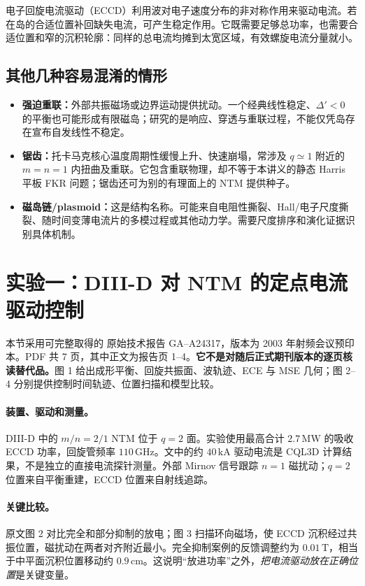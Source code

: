 电子回旋电流驱动（ECCD）利用波对电子速度分布的非对称作用来驱动电流。若在岛的合适位置补回缺失电流，可产生稳定作用。它既需要足够总功率，也需要合适位置和窄的沉积轮廓：同样的总电流均摊到太宽区域，有效螺旋电流分量就小。

\subsection{其他几种容易混淆的情形}

\begin{itemize}
 \item \textbf{强迫重联：}外部共振磁场或边界运动提供扰动。一个经典线性稳定、$\Delta'<0$ 的平衡也可能形成有限磁岛；研究的是响应、穿透与重联过程，不能仅凭岛存在宣布自发线性不稳定。
 \item \textbf{锯齿：}托卡马克核心温度周期性缓慢上升、快速崩塌，常涉及 $q\simeq1$ 附近的 $m=n=1$ 内扭曲及重联。它包含重联物理，却不等于本讲义的静态 Harris 平板 FKR 问题；锯齿还可为别的有理面上的 NTM 提供种子。
 \item \textbf{磁岛链/plasmoid：}这是结构名称。可能来自电阻性撕裂、Hall/电子尺度撕裂、随时间变薄电流片的多模过程或其他动力学。需要尺度排序和演化证据识别具体机制。
\end{itemize}

\section{实验一：DIII-D 对 NTM 的定点电流驱动控制}
\label{tm:sec:diiid}

本节采用可完整取得的 \citet{TMPetty2003} 原始技术报告 GA--A24317，版本为 2003 年射频会议预印本。PDF 共 7 页，其中正文为报告页 1--4。\textbf{它不是对随后正式期刊版本的逐页核读替代品。}图 1 给出成形平衡、回旋共振面、波轨迹、ECE 与 MSE 几何；图 2--4 分别提供控制时间轨迹、位置扫描和模型比较。

\paragraph{装置、驱动和测量。}
DIII-D 中的 $m/n=2/1$ NTM 位于 $q=2$ 面。实验使用最高合计 $2.7\,\mathrm{MW}$ 的吸收 ECCD 功率，回旋管频率 $110\,\mathrm{GHz}$。文中的约 $40\,\mathrm{kA}$ 驱动电流是 CQL3D 计算结果，不是独立的直接电流探针测量。外部 Mirnov 信号跟踪 $n=1$ 磁扰动；$q=2$ 位置来自平衡重建，ECCD 位置来自射线追踪。

\paragraph{关键比较。}
原文图 2 对比完全和部分抑制的放电；图 3 扫描环向磁场，使 ECCD 沉积经过共振位置，磁扰动在两者对齐附近最小。完全抑制案例的反馈调整约为 $0.01\,\mathrm T$，相当于中平面沉积位置移动约 $0.9\,\mathrm{cm}$。这说明“放进功率”之外，\emph{把电流驱动放在正确位置}是关键变量。

